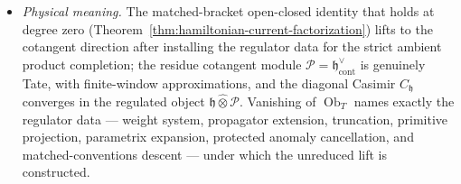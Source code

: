\documentclass[11pt]{memoir}
\begin{document}
\begin{thm}
\begin{itemize}
      compatible family \((C^M_{\mathfrak h})_M\) lies in the cokernel of
      the represented-kernel map into
      \(\mathfrak h\widehat\otimes D\)
      (Lemma~\ref{lem:tate-casimir-obstruction},
      Theorem~\ref{thm:strict-unweighted-obstruction}).  This is the canonical
      construction defect blocking the strict-unweighted endpoint and
      requiring the weighted Tate completion of
      Definition~\ref{defn:wt-coefficient-pair}.
    \item \emph{Physical meaning.}  The matched-bracket open-closed
      identity that holds at degree zero
      (Theorem~\ref{thm:hamiltonian-current-factorization}) lifts to the
      cotangent direction after installing the regulator data for the
      strict ambient product completion; the residue cotangent module
      \(\mathcal P=\mathfrak h^\vee_{\mathrm{cont}}\) is genuinely
      Tate, with finite-window approximations, and the diagonal Casimir
      \(C_{\mathfrak h}\) converges in the regulated object
      \(\mathfrak h\widehat\otimes\mathcal P\).  Vanishing of
      \(\operatorname{Ob}_T\) names
      exactly the regulator data --- weight system, propagator
      extension, truncation, primitive projection, parametrix expansion,
      protected anomaly cancellation, and matched-conventions descent
      --- under which the unreduced lift is constructed.
  \end{itemize}
\end{thm}
\end{document}
